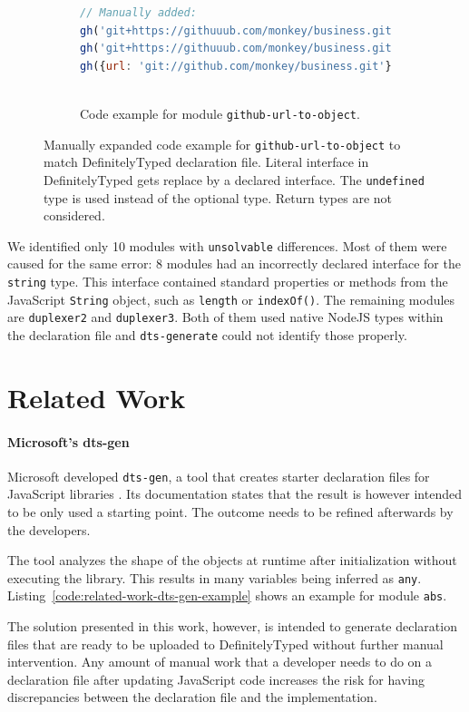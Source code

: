 \documentclass[english,cleveref,autoref,submission]{programming}
\newcommand{\coderef}[1]{Listing~\ref{#1}}
\begin{document}
\begin{figure}[tp]
\begin{subfigure}{0.80\linewidth}
\begin{lstlisting}[language=JavaScript]
// Manually added:
gh('git+https://githuuub.com/monkey/business.git', {});
gh('git+https://githuuub.com/monkey/business.git', {enterprise: true});
gh({url: 'git://github.com/monkey/business.git'});
      
    \end{lstlisting}
    \caption{Code example for module \texttt{github-url-to-object}.}
    \end{subfigure}
  \caption{Manually expanded code example for \texttt{github-url-to-object} to match DefinitelyTyped declaration file. Literal interface in DefinitelyTyped gets replace by a declared interface. The \texttt{undefined} type is used instead of the optional type. Return types are not considered.}
  \label{fig:experiments-results-manually-completed-examples}
\end{figure}

We identified only 10 modules with \texttt{unsolvable} differences. Most of them were caused for the same error: 8 modules had an incorrectly declared interface for the \texttt{string} type. This interface contained standard properties or methods from the JavaScript \texttt{String} object, such as \texttt{length} or \texttt{indexOf()}. The remaining modules are \texttt{duplexer2} and \texttt{duplexer3}. Both of them used native NodeJS types within the declaration file and \texttt{dts-generate} could not identify those properly.


\section{Related Work}
\label{sec:related-work}
\paragraph*{Microsoft's dts-gen}
Microsoft developed \texttt{dts-gen}, a tool that creates starter declaration files for JavaScript libraries \cite{dts-gen}. Its documentation states that the result is however intended to be only used a starting point. The outcome needs to be refined afterwards by the developers.

The tool analyzes the shape of the objects at runtime after initialization without executing the library. This results in many variables being inferred as \lstinline[language={}]{any}. \coderef{code:related-work-dts-gen-example} shows an example for module \lstinline[language={}]{abs}.

The solution presented in this work, however, is intended to generate declaration files that are ready to be uploaded to DefinitelyTyped without further manual intervention. Any amount of manual work that a developer needs to do on a declaration file after updating JavaScript code increases the risk for having discrepancies between the declaration file and the implementation.
\end{document}
